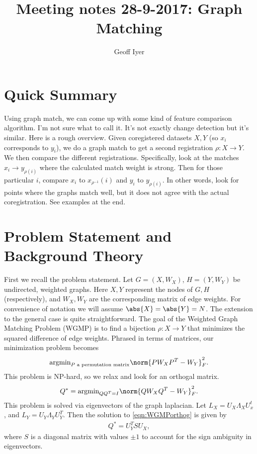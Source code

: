 \documentclass[12pt]{article}
\title{Meeting notes 28-9-2017: Graph Matching}
\author{Geoff Iyer}
\date{}
\begin{document}
\maketitle

\section*{Quick Summary}

Using graph match, we can come up with some kind of feature comparison
algorithm.  I'm not sure what to call it. It's not exactly change detection but
it's similar.  Here is a rough overview. Given coregistered datasets $X,Y$ (so
$x_i$ corresponds to $y_i$), we do a graph match to get a second registration
$\rho: X\to Y$. We then compare the different registrations. Specifically, look
at the matches $x_i \to y_{\rho(i)}$ where the calculated match weight is
strong. Then for those particular $i$, compare $x_i$ to $ x_{\rho^{-1}}(i)$ and
$y_i$ to $y_{\rho(i)}$. In other words, look for points where the graphs match
well, but it does not agree with the actual coregistration. See examples at the end.

\section*{Problem Statement and Background Theory}

First we recall the problem statement. Let $G = (X,W_X)$, $H = (Y,W_Y)$ be
undirected, weighted graphs. Here $X, Y$ represent the nodes of $G, H$
(respectively), and $W_X,W_Y$ are the corresponding matrix of edge weights. For
convenience of notation we will assume $\abs{X} = \abs{Y} = N$. The extension to
the general case is quite straightforward. The goal of the Weighted Graph
Matching Problem (WGMP) is to find a bijection $\rho:X \to Y$ that minimizes the
squared difference of edge weights. Phrased in terms of matrices, our
minimization problem becomes
\begin{align}
  \label{eqn:WGMPperm} \text{argmin}_{P\text{ a permutation
  matrix}}\norm{PW_XP^T - W_Y}^2_F.
\end{align}
This problem is NP-hard, so we relax and look for an orthogal matrix.
\begin{align}
  \label{eqn:WGMPorthog} Q^* = \text{argmin}_{QQ^T=I}\norm{QW_XQ^T - W_Y}^2_F.
\end{align}
This problem is solved via eigenvectors of the graph laplacian.  Let
$L_X = U_X \Lambda_X U_x^t$, and $L_Y = U_Y \Lambda_Y U_Y^T$. Then the solution
to \ref{eqn:WGMPorthog} is given by
\begin{align}
  \label{eqn:WGMPorthogsolution} Q^* = U_Y^T S U_X,
\end{align}
where $S$ is a diagonal matrix with values $\pm 1$ to account for the sign
ambiguity in eigenvectors.
\end{document}
